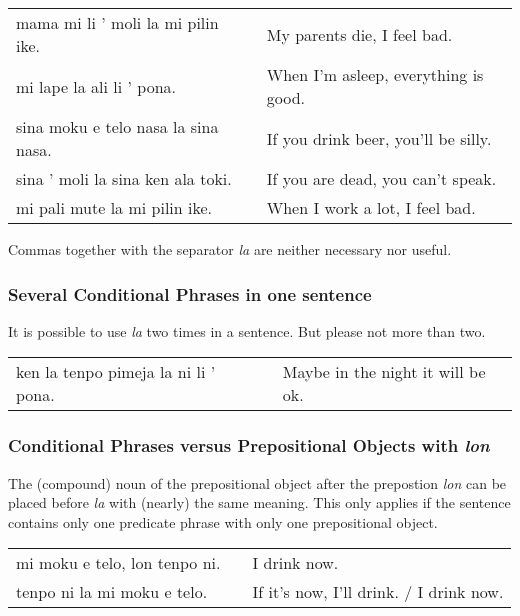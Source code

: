 \begin{supertabular}{p{5,5cm}|ll}
mama mi li ' moli la mi pilin ike. && My parents die, I feel bad. \\
mi lape la ali li ' pona. && When I'm asleep, everything is good. \\
sina moku e telo nasa la sina nasa. && If you drink beer, you'll be silly. \\
sina ' moli la sina ken ala toki. && If you are dead, you can't speak. \\
mi pali mute la mi pilin ike. && When I work a lot, I feel bad. \\
\end{supertabular} 

Commas together with the separator \textit{la} are neither necessary nor useful. 

%
%
\subsubsection*{Several Conditional Phrases in one sentence}
%
%
It is possible to use \textit{la} two times in a sentence. 
But please not more than two. 

\begin{supertabular}{p{5,5cm}|ll}
ken la tenpo pimeja la ni li ' pona. && Maybe in the night it will be ok. \\  
\end{supertabular} 

%
\subsubsection*{Conditional Phrases versus Prepositional Objects with \textit{lon} }
%
The (compound) noun of the prepositional object after the prepostion \textit{lon} can be placed before \textit{la} with (nearly) the same meaning.
This only applies if the sentence contains only one predicate phrase with only one prepositional object. 

\begin{supertabular}{p{5,5cm}|ll}
mi moku e telo, lon tenpo ni. && I drink now. \\
tenpo ni la mi moku e telo.  && If it's now, I'll drink. / I drink now. \\
\end{supertabular} 

